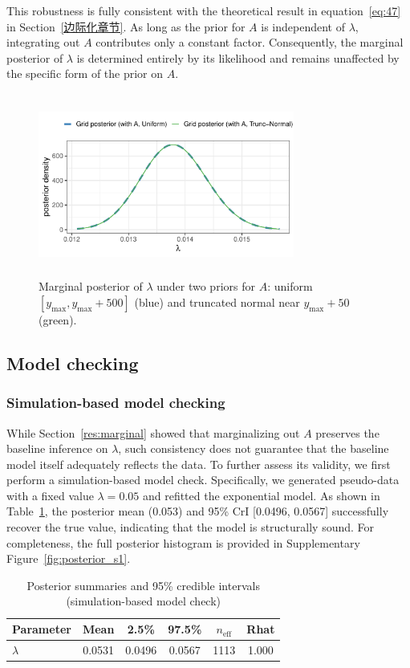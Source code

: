 This robustness is fully consistent with the theoretical result in equation~\eqref{eq:47} in Section~\ref{边际化章节}. As long as the prior for $A$ is independent of $\lambda$, integrating out $A$ contributes only a constant factor. Consequently, the marginal posterior of $\lambda$ is determined entirely by its likelihood and remains unaffected by the specific form of the prior on $A$.
\begin{figure}[H]
    \centering
    \includegraphics[height=6cm, width=0.75\textwidth]{images/diff_A_prior_marginal_compare.pdf}
    \caption{{\small Marginal posterior of $\lambda$ under two priors for $A$: uniform $[y_{\max}, y_{\max}+500]$ (blue) and truncated normal near $y_{\max}+50$ (green).}}
    \label{fig:diff_A_marginal}
\end{figure}
\subsection{Model checking}
\label{res: model checking}
\subsubsection{Simulation-based model checking}
While Section~\ref{res:marginal} showed that marginalizing out $A$ preserves the baseline inference on $\lambda$, such consistency does not guarantee that the baseline model itself adequately reflects the data. To further assess its validity, we first perform a simulation-based model check. Specifically, we generated pseudo-data with a fixed value $\lambda=0.05$ and refitted the exponential model. As shown in Table~\ref{tab:post-ci}, the posterior mean (0.053) and 95\% CrI [0.0496, 0.0567] successfully recover the true value, indicating that the model is structurally sound. For completeness, the full posterior histogram is provided in Supplementary Figure~\ref{fig:posterior_s1}.
\begin{table}[H]
\centering
\caption{{\small Posterior summaries and 95\% credible intervals (simulation-based model check)}}
\label{tab:post-ci}
\small
\begin{tabular}{lccccc}
\toprule
{Parameter} & {Mean} & {2.5\%} & {97.5\%} & {$n_{\text{eff}}$} & {Rhat} \\
\midrule
$\lambda$   & 0.0531 & 0.0496 & 0.0567 & 1113 & 1.000 \\
\bottomrule
\end{tabular}
\end{table}

